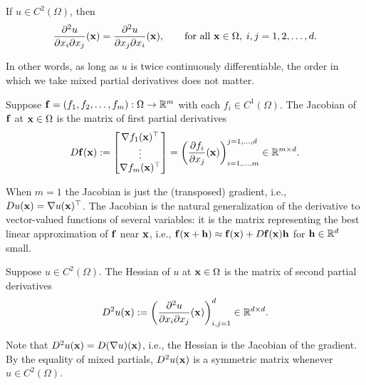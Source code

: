 \begin{lemma}
    \label{lem:mixed-partials}
    If $u \in C^2(\Omega)$, then
    \begin{equation*}
        \frac{\partial^2 u}{\partial x_i \partial x_j}(\mathbf{x}) =
        \frac{\partial^2 u}{\partial x_j \partial x_i}(\mathbf{x}),
        \qquad \text{for all } \mathbf{x} \in \Omega, \; i,j = 1,2,\ldots,d.
    \end{equation*}
\end{lemma}
In other words, as long as $u$ is twice continuously differentiable, the
order in which we take mixed partial derivatives does not matter.

\begin{definition}[Jacobian]\label{def:jacobian}
    Suppose $\mathbf{f} = (f_1, f_2, \ldots, f_m): \Omega \to \mathbb{R}^m$ with each
    $f_i \in C^1(\Omega)$. The Jacobian of $\mathbf{f}$ at $\mathbf{x} \in \Omega$ is
    the matrix of first partial derivatives
    \begin{equation*}
        D\mathbf{f}(\mathbf{x}) :=
        \begin{bmatrix}
            \nabla f_1(\mathbf{x})^\top \\
            \vdots \\
            \nabla f_m(\mathbf{x})^\top
        \end{bmatrix}
        =
        \left(
            \frac{\partial f_i}{\partial x_j}(\mathbf{x})
        \right)_{i=1,\ldots,m}^{j=1,\ldots,d}
        \in \mathbb{R}^{m \times d}.
    \end{equation*}
\end{definition}
When $m=1$ the Jacobian is just the (transposed) gradient, i.e.,
$Du(\mathbf{x}) = \nabla u(\mathbf{x})^\top$. The Jacobian is the natural
generalization of the derivative to vector-valued functions of several
variables: it is the matrix representing the best linear approximation
of $\mathbf{f}$ near $\mathbf{x}$, i.e., $\mathbf{f}(\mathbf{x} + \mathbf{h}) \approx \mathbf{f}(\mathbf{x}) +
D\mathbf{f}(\mathbf{x}) \mathbf{h}$ for $\mathbf{h} \in \mathbb{R}^d$ small.

\begin{definition}[Hessian]
    Suppose $u \in C^2(\Omega)$. The Hessian of $u$ at $\mathbf{x} \in \Omega$
    is the matrix of second partial derivatives
    \begin{equation*}
        D^2 u(\mathbf{x}) :=
        \left(
            \frac{\partial^2 u}{\partial x_i \partial x_j}(\mathbf{x})
        \right)_{i,j=1}^d \in \mathbb{R}^{d \times d}.
    \end{equation*}
\end{definition}
Note that $D^2 u(\mathbf{x}) = D(\nabla u)(\mathbf{x})$, i.e., the Hessian is the
Jacobian of the gradient. By the equality of mixed partials, $D^2
u(\mathbf{x})$ is a symmetric matrix whenever $u \in C^2(\Omega)$.

